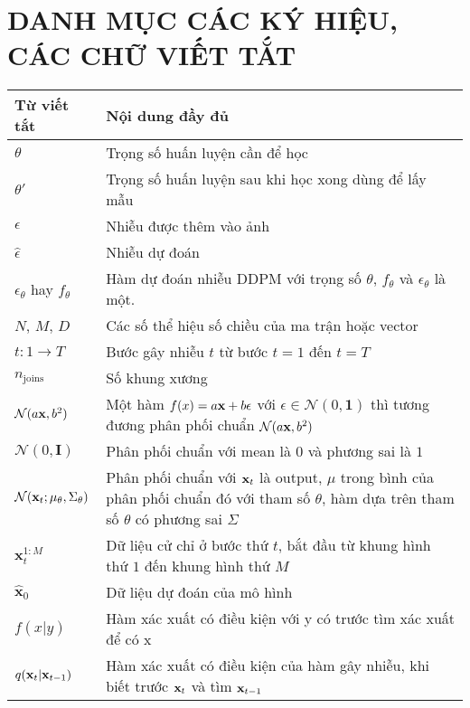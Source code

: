 
\pagebreak
{}
{}
\section*{\textbf{ \Large DANH MỤC CÁC KÝ HIỆU, CÁC CHỮ VIẾT TẮT}}

\begin{center}
\begin{tabular}{|p{3cm}|p{11cm}|}
\hline
\textbf{Từ viết tắt} & \textbf{Nội dung đầy đủ} \\
\hline
$\theta$ & Trọng số huấn luyện cần để học \\
\hline
$\theta'$ & Trọng số huấn luyện sau khi học xong dùng để lấy mẫu \\
\hline
$\epsilon$ & Nhiễu được thêm vào ảnh \\
\hline
$\hat{\epsilon}$ & Nhiễu dự đoán\\
\hline
$\epsilon_\theta$ hay $f_\theta$ & Hàm dự đoán nhiễu DDPM với trọng số $\theta$, $f_\theta$ và $\epsilon_\theta$ là một. \\
\hline
$N$, $M$, $D$ & Các số thể hiệu số chiều của ma trận hoặc vector \\
\hline
$t: 1 \rightarrow T$ & Bước gây nhiễu $t$ từ bước $t=1$ đến $t=T$ \\
\hline
$n_{\operatorname{joins}}$ & Số khung xương \\
\hline
$\mathcal{N}(a \mathbf{x}, b^2)$ & Một hàm $f(x) = a \mathbf{x} + b \epsilon$ với $\epsilon \in \mathcal{N}(0, \mathbf{1})$ thì tương đương phân phối chuẩn $\mathcal{N}(a \mathbf{x}, b^2)$ \\
\hline
$\mathcal{N}(0, \mathbf{I})$ & Phân phối chuẩn với mean là $0$ và phương sai là $1$ \\
\hline
$\mathcal{N}(\mathbf{x}_t; \mu_\theta, \Sigma_\theta)$ & Phân phối chuẩn với $\mathbf{x}_t$ là output, $\mu$ trong bình của phân phối chuẩn đó với tham số $\theta$,  hàm dựa trên tham số $\theta$ có phương sai  $\Sigma$ \\ 
\hline
$\mathbf{x}_{t}^{1:M}$ & Dữ liệu cử chỉ ở bước thứ $t$, bắt đầu từ khung hình thứ $1$ đến khung hình thứ $M$ \\
\hline
$\hat{\mathbf{x}}_0$ &  Dữ liệu dự đoán của mô hình \\
\hline
$f(x | y)$ & Hàm xác xuất có điều kiện với y có trước tìm xác xuất để có x \\
\hline
$q(\mathbf{x}_t | \mathbf{x}_{t-1})$ & Hàm xác xuất có điều kiện của hàm gây nhiễu, khi biết trước $\mathbf{x}_t$ và tìm $\mathbf{x}_{t-1}$  \\

\end{tabular}
\end{center}
